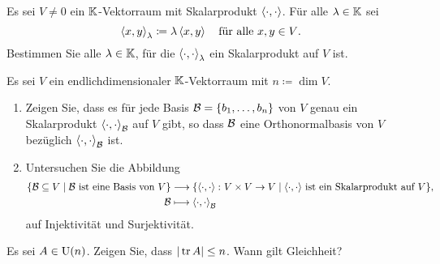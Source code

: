 \begin{question}[subtitle = Vielfache von Skalarprodukten]{2}
  Es sei $V \neq 0$ ein $\mathbb{K}$-Vektorraum mit Skalarprodukt $\left\langle \cdot, \cdot \right\rangle$.
  Für alle $\lambda \in \mathbb{K}$ sei
  \[
    \left\langle x, y \right\rangle_\lambda \coloneqq \lambda \left\langle x, y \right\rangle
    \quad
    \text{für alle $x, y \in V$}.
  \]
  Bestimmen Sie alle $\lambda \in \mathbb{K}$, für die $\left\langle \cdot, \cdot \right\rangle_\lambda$ ein Skalarprodukt auf $V$ ist.
\end{question}


\begin{question}[subtitle = Skalarprodukte durch Vorgabe von Orthonormalbasen]{2}
  Es sei $V$ ein endlichdimensionaler $\mathbb{K}$-Vektorraum mit $n \coloneqq \dim V$.
  \begin{enumerate}[leftmargin=*]
    \item
      Zeigen Sie, dass es für jede Basis $\mathcal{B} = \{b_1, \dotsc, b_n\}$ von $V$ genau ein Skalarprodukt $\left\langle \cdot, \cdot \right\rangle_{\mathcal{B}}$ auf $V$ gibt, so dass $\mathcal{B}$ eine Orthonormalbasis von $V$ bezüglich $\left\langle \cdot, \cdot \right\rangle_{\mathcal{B}}$ ist.
    \item
      Untersuchen Sie die Abbildung
      \begin{align*}
         \{\mathcal{B} \subseteq V \mid \text{$\mathcal{B}$ ist eine Basis von $V$}\}
        &\longrightarrow
         \{\left\langle \cdot, \cdot \right\rangle \colon V \times V \to V \mid \text{$\left\langle \cdot, \cdot \right\rangle$ ist ein Skalarprodukt auf $V$}\},
        \\
         \mathcal{B}
        &\longmapsto
         \left\langle \cdot, \cdot \right\rangle_{\mathcal{B}}
      \end{align*}
      auf Injektivität und Surjektivität.
  \end{enumerate}
\end{question}


\begin{question}[subtitle = Die Spur einer unitären Matrix]{2}
  Es sei $A \in \operatorname{U}(n)$.
  Zeigen Sie, dass $|\operatorname{tr} A| \leq n$.
  Wann gilt Gleichheit?
\end{question}


